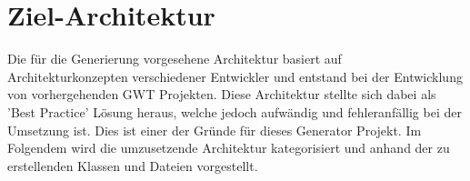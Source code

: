 \section{Ziel-Architektur}\label{AufBZielArchitektur}
Die für die Generierung vorgesehene Architektur basiert auf 
Architekturkonzepten verschiedener Entwickler und entstand bei der Entwicklung
von vorhergehenden GWT Projekten. Diese Architektur stellte sich dabei als 'Best
Practice' Lösung heraus, welche jedoch aufwändig und fehleranfällig bei der
Umsetzung ist. Dies ist einer der Gründe für dieses Generator Projekt.
Im Folgendem wird die umzusetzende Architektur kategorisiert und anhand der zu
erstellenden Klassen und Dateien vorgestellt.
